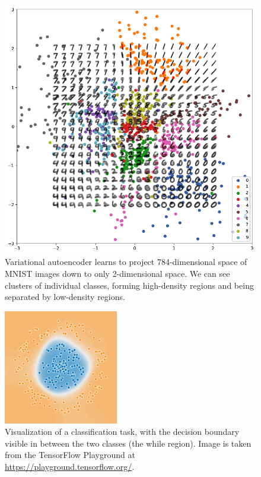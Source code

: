 \begin{figure}[p]
    \centering
    \includegraphics[width=140mm]{../img/mnist-manifold.png}
    \caption{Variational autoencoder learns to project 784-dimensional space of MNIST images down to only 2-dimensional space. We can see clusters of individual classes, forming high-density regions and being separated by low-density regions.}
    \label{fig:MnistManifold}
\end{figure}

\begin{figure}[p]
    \centering
    \includegraphics[width=50mm]{../img/decision-boundary.png}
    \caption{Visualization of a classification task, with the decision boundary visible in between the two classes (the while region). Image is taken from the TensorFlow Playground at \url{https://playground.tensorflow.org/}.}
    \label{fig:DecisionBoundary}
\end{figure}

